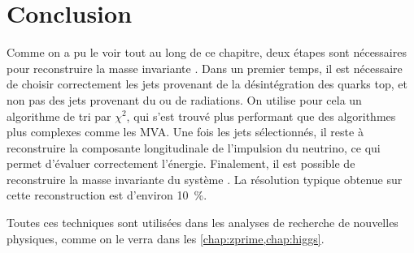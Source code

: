 
\section{Conclusion}

Comme on a pu le voir tout au long de ce chapitre, deux étapes sont nécessaires pour reconstruire la masse invariante \ttbar. Dans un premier temps, il est nécessaire de choisir correctement les jets provenant de la désintégration des quarks top, et non pas des jets provenant du \pu ou de radiations. On utilise pour cela un algorithme de tri par $\chi^2$, qui s'est trouvé plus performant que des algorithmes plus complexes comme les MVA. Une fois les jets sélectionnés, il reste à reconstruire la composante longitudinale de l'impulsion du neutrino, ce qui permet d'évaluer correctement l'énergie. Finalement, il est possible de reconstruire la masse invariante du système \ttbar. La résolution typique obtenue sur cette reconstruction est d'environ \SI{10}{\percent}.

\bigskip

Toutes ces techniques sont utilisées dans les analyses de recherche de nouvelles physiques, comme on le verra dans les \cref{chap:zprime,chap:higgs}.